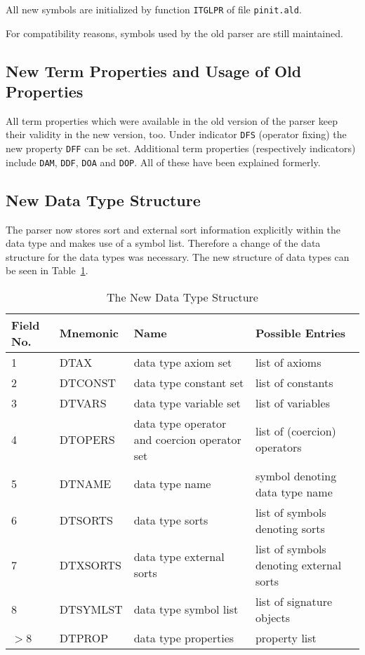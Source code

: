 All new symbols are initialized by function {\tt ITGLPR} of file
{\tt pinit.ald}.

For compatibility reasons, symbols used by the old parser are still
maintained.

\subsection{New Term Properties and Usage of Old Properties}

All term properties which were available in the old version of the
parser keep their validity in the new version, too. Under indicator
{\tt DFS} (operator fixing) the new property {\tt DFF} can be set.
Additional term properties (respectively indicators) include {\tt DAM},
{\tt DDF}, {\tt DOA} and {\tt DOP}. All of these have been explained formerly.

\subsection{New Data Type Structure}
The parser now stores sort and external sort information explicitly
within the data type and makes use of a symbol list.
Therefore a change of the data structure for the data types was necessary. 
The new structure of data types can be seen in Table~\ref{datatype}.

\begin{table}[htbp]
\begin{center}
\begin{tabular}{|l|l|p{2in}|p{2in}|}
\hline
Field No. & Mnemonic & Name & Possible Entries\\
\hline \hline
1 & DTAX & data type axiom set & list of axioms \\ \hline
2 & DTCONST & data type constant set & list of constants \\ \hline
3 & DTVARS & data type variable set & list of variables \\ \hline
4 & DTOPERS & data type operator and coercion operator set 
  & list of (coercion) operators \\ \hline
5 & DTNAME & data type name & symbol denoting data type name \\ \hline
6 & DTSORTS & data type sorts & list of symbols denoting sorts \\ \hline
7 & DTXSORTS & data type external sorts
  & list of symbols denoting external sorts \\ \hline
8 & DTSYMLST & data type symbol list & list of signature objects \\ \hline
$>$8 & DTPROP & data type properties & property list \\ \hline
\end{tabular}
\end{center}
\caption{The New Data Type Structure}
\label{datatype}
\end{table}

